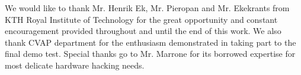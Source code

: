 \ringraziamenti

We would like to thank Mr. Henrik Ek, Mr. Pieropan and Mr. Ekekrants from KTH Royal Institute of Technology for the great opportunity and constant encouragement provided throughout and until the end of this work. We also thank CVAP department for the enthusiasm demonstrated in taking part to the final demo test. Special thanks go to Mr. Marrone for its borrowed expertise for most delicate hardware hacking needs.

